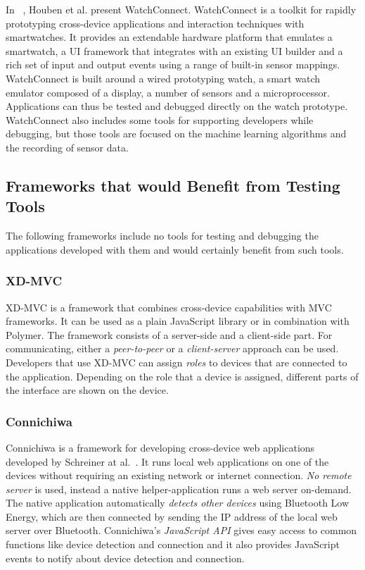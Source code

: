 In ~\cite{watchconnect2015}, Houben et al. present WatchConnect. WatchConnect is a toolkit for rapidly prototyping cross-device applications and interaction techniques with smartwatches. It provides an extendable hardware platform that emulates a smartwatch, a UI framework that integrates with an existing UI builder and a rich set of input and output events using a range of built-in sensor mappings. WatchConnect is built around a wired prototyping watch, a smart watch emulator composed of a display, a number of sensors and a microprocessor. Applications can thus be tested and debugged directly on the watch prototype. WatchConnect also includes some tools for supporting developers while debugging, but those tools are focused on the machine learning algorithms and the recording of sensor data.

\subsection{Frameworks that would Benefit from Testing Tools}

The following frameworks include no tools for testing and debugging the applications developed with them and would certainly benefit from such tools.

\subsubsection{XD-MVC}

XD-MVC is a framework that combines cross-device capabilities with MVC frameworks. It can be used as a plain JavaScript library or in combination with Polymer. The framework consists of a server-side and a client-side part. For communicating, either a \emph{peer-to-peer} or a \emph{client-server} approach can be used. Developers that use XD-MVC can assign \emph{roles} to devices that are connected to the application. Depending on the role that a device is assigned, different parts of the interface are shown on the device. 

\subsubsection{Connichiwa}

Connichiwa is a framework for developing cross-device web applications developed by Schreiner at al.~\cite{connichiwa2015}. It runs local web applications on one of the devices without requiring an existing network or internet connection. \emph{No remote server} is used, instead a native helper-application runs a web server on-demand. The native application automatically \emph{detects other devices} using Bluetooth Low Energy, which are then connected by sending the IP address of the local web server over Bluetooth. Connichiwa's \emph{JavaScript API} gives easy access to common functions like device detection and connection and it also provides JavaScript events to notify about device detection and connection.

